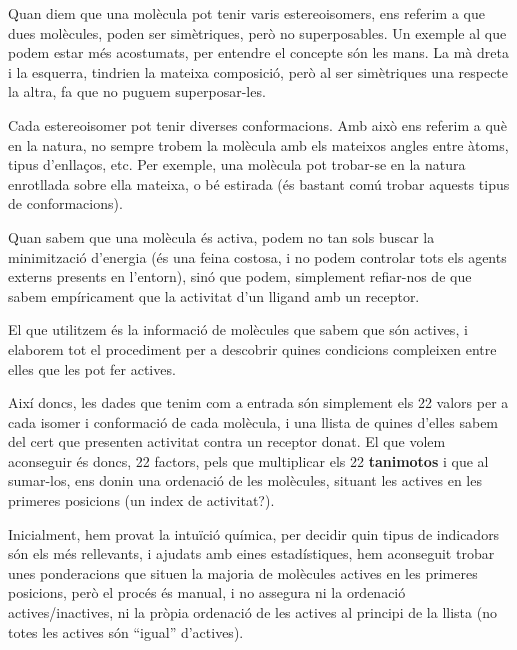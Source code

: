 Quan diem que una molècula pot tenir varis estereoisomers, ens referim a que
dues molècules, poden ser simètriques, però no superposables.  Un exemple al que
podem estar més acostumats, per entendre el concepte són les mans.  La mà dreta
i la esquerra, tindrien la mateixa composició, però al ser simètriques una
respecte la altra, fa que no puguem superposar-les.

Cada estereoisomer pot tenir diverses conformacions.  Amb això ens referim a què
en la natura, no sempre trobem la molècula amb els mateixos angles entre àtoms,
tipus d'enllaços, etc. Per exemple, una molècula pot trobar-se en la natura
enrotllada sobre ella mateixa, o bé estirada (és bastant comú trobar aquests
tipus de conformacions).


Quan sabem que una molècula és activa, podem no tan sols buscar la minimització
d'energia (és una feina costosa, i no podem controlar tots els agents externs
presents en l'entorn), sinó que podem, simplement refiar-nos de que sabem
empíricament que la activitat d'un lligand amb un receptor.



El que utilitzem és la informació de molècules que sabem que són actives,
i elaborem tot el procediment per a descobrir quines condicions compleixen entre
elles que les pot fer actives.

Així doncs, les dades que tenim com a entrada són simplement els 22 valors per a cada isomer i
conformació de cada molècula, i una llista de quines d'elles sabem del cert que presenten activitat
contra un receptor donat.  El que volem aconseguir és doncs, 22 factors, pels que multiplicar els 22
\textbf{tanimotos} i que al sumar-los, ens donin una ordenació de les molècules, situant les actives
en les primeres posicions (un index de activitat?).


Inicialment, hem provat la intuïció química, per decidir quin tipus de
indicadors són els més rellevants, i ajudats amb eines estadístiques, hem
aconseguit trobar unes ponderacions que situen la majoria de molècules actives
en les primeres posicions, però el procés és manual, i no assegura ni la
ordenació actives/inactives, ni la pròpia ordenació de les actives al principi
de la llista (no totes les actives són ``igual'' d'actives).


